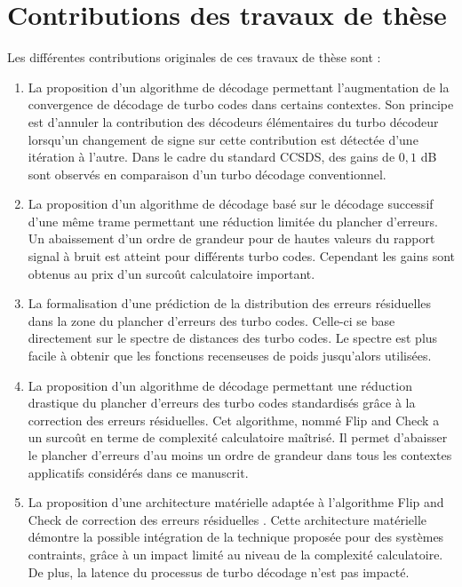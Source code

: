 \section*{Contributions des travaux de thèse}
Les différentes contributions originales de ces travaux de thèse sont : 
\begin{enumerate}
	\item La proposition d'un algorithme de décodage permettant l'augmentation de la convergence de décodage de 
	turbo codes dans certains contextes. Son principe est d'annuler la contribution des décodeurs élémentaires du 
	turbo décodeur lorsqu'un changement de signe sur cette contribution est détectée d'une itération à l'autre. Dans le
	cadre du standard CCSDS, des gains de $0,1$ dB sont observés en comparaison d'un turbo décodage conventionnel.
	\item La proposition d'un algorithme de décodage basé sur le décodage successif d'une même trame permettant une 
	réduction limitée du plancher d'erreurs. Un abaissement d'un ordre de grandeur pour de hautes valeurs du rapport signal à bruit est atteint pour différents turbo codes. Cependant les gains sont obtenus au prix d'un surcoût calculatoire important. 
	\item La formalisation d'une prédiction de la distribution des erreurs résiduelles dans la zone du plancher 
	d'erreurs des turbo codes. Celle-ci se base directement sur le spectre de distances des turbo codes. Le spectre est
	plus 
	facile à obtenir que les fonctions recenseuses de poids jusqu'alors utilisées.
	\item La proposition d'un algorithme de décodage permettant une réduction drastique du plancher d'erreurs des 
	turbo codes standardisés grâce à la correction des erreurs résiduelles. Cet algorithme, nommé Flip and Check a un surcoût en 
	terme de complexité calculatoire maîtrisé. Il permet d'abaisser le plancher d'erreurs d'au moins un ordre de grandeur 
	dans tous les contextes applicatifs considérés dans ce manuscrit.
	\item La proposition d'une architecture matérielle adaptée à l'algorithme Flip and Check de correction des erreurs résiduelles
	.
	Cette architecture matérielle démontre la possible intégration de la technique proposée pour des systèmes contraints, 
	grâce à un impact limité au niveau de la complexité calculatoire. De plus, la latence du 
	processus de turbo décodage n'est pas impacté.\\
\end{enumerate}
